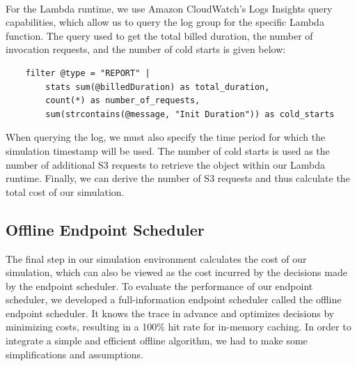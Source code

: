 
~\\
For the Lambda runtime, we use Amazon CloudWatch's Logs Insights query capabilities, which allow us to query the log group for the specific Lambda function. The query used to get the total billed duration, the number of invocation requests, and the number of cold starts is given below:
\begin{lstlisting}
    filter @type = "REPORT" | 
        stats sum(@billedDuration) as total_duration, 
        count(*) as number_of_requests, 
        sum(strcontains(@message, "Init Duration")) as cold_starts
\end{lstlisting}
When querying the log, we must also specify the time period for which the simulation timestamp will be used. The number of cold starts is used as the number of additional S3 requests to retrieve the object within our Lambda runtime. Finally, we can derive the number of S3 requests and thus calculate the total cost of our simulation.

\subsection{Offline Endpoint Scheduler}
\label{sec:offline_endpoint_scheduler}
The final step in our simulation environment calculates the cost of our simulation, which can also be viewed as the cost incurred by the decisions made by the endpoint scheduler. To evaluate the performance of our endpoint scheduler, we developed a full-information endpoint scheduler called the offline endpoint scheduler. It knows the trace in advance and optimizes decisions by minimizing costs, resulting in a 100\% hit rate for in-memory caching. In order to integrate a simple and efficient offline algorithm, we had to make some simplifications and assumptions. 

